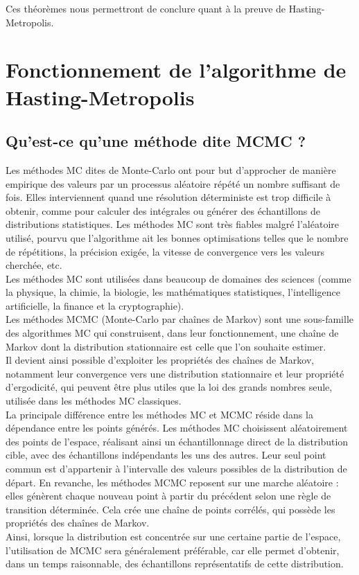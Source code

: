 \documentclass{article}
\begin{document}
Ces théorèmes nous permettront de conclure quant à la preuve de Hasting-Metropolis.

\newpage %
\section{Fonctionnement de l'algorithme de Hasting-Metropolis}

\subsection{Qu'est-ce qu'une méthode dite MCMC ?}

Les méthodes MC dites de Monte-Carlo ont pour but d'approcher de manière empirique des valeurs par un processus aléatoire répété un nombre suffisant de fois. Elles interviennent quand une résolution déterministe est trop difficile à obtenir, comme pour calculer des intégrales ou générer des échantillons de distributions statistiques. Les méthodes MC sont très fiables malgré l'aléatoire utilisé, pourvu que l'algorithme ait les bonnes optimisations telles que le nombre de répétitions, la précision exigée, la vitesse de convergence vers les valeurs cherchée, etc. \\
Les méthodes MC sont utilisées dans beaucoup de domaines des sciences (comme la physique, la chimie, la biologie, les mathématiques statistiques, l'intelligence artificielle, la finance et la cryptographie). \\

Les méthodes MCMC (Monte-Carlo par chaînes de Markov) sont une sous-famille des algorithmes MC qui construisent, dans leur fonctionnement, une chaîne de Markov dont la distribution stationnaire est celle que l'on souhaite estimer. \\
Il devient ainsi possible d'exploiter les propriétés des chaînes de Markov, notamment leur convergence vers une distribution stationnaire et leur propriété d'ergodicité, qui peuvent être plus utiles que la loi des grands nombres seule, utilisée dans les méthodes MC classiques. \\
La principale différence entre les méthodes MC et MCMC réside dans la dépendance entre les points générés. Les méthodes MC choisissent aléatoirement des points de l'espace, réalisant ainsi un échantillonnage direct de la distribution cible, avec des échantillons indépendants les uns des autres. Leur seul point commun est d'appartenir à l'intervalle des valeurs possibles de la distribution de départ. En revanche, les méthodes MCMC reposent sur une marche aléatoire : elles génèrent chaque nouveau point à partir du précédent selon une règle de transition déterminée. Cela crée une chaîne de points corrélés, qui possède les propriétés des chaînes de Markov. \\
Ainsi, lorsque la distribution est concentrée sur une certaine partie de l'espace, l'utilisation de MCMC sera généralement préférable, car elle permet d'obtenir, dans un temps raisonnable, des échantillons représentatifs de cette distribution. \\
\end{document}
